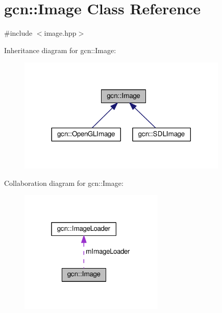 \hypertarget{classgcn_1_1Image}{}\section{gcn\+:\+:Image Class Reference}
\label{classgcn_1_1Image}


{\ttfamily \#include $<$image.\+hpp$>$}



Inheritance diagram for gcn\+:\+:Image\+:\nopagebreak
\begin{figure}[H]
\begin{center}
\leavevmode
\includegraphics[width=284pt]{classgcn_1_1Image__inherit__graph}
\end{center}
\end{figure}


Collaboration diagram for gcn\+:\+:Image\+:\nopagebreak
\begin{figure}[H]
\begin{center}
\leavevmode
\includegraphics[width=196pt]{classgcn_1_1Image__coll__graph}
\end{center}
\end{figure}
